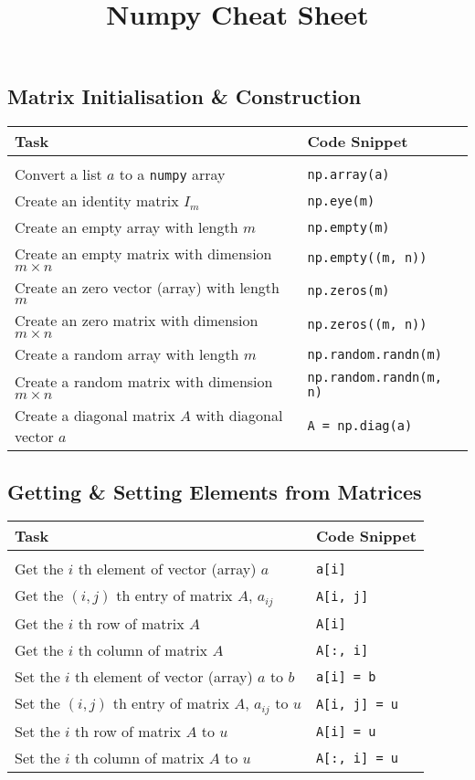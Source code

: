 \documentclass[a4paper,11pt]{article}
\begin{document}
\title{Numpy Cheat Sheet}
\author{}
\date{}
\maketitle
\subsection*{Matrix Initialisation \& Construction}
\begin{tabular}{p{9cm} |p{5cm}}
Task & Code Snippet \\
\hline \\
Convert a list $a$ to a \texttt{numpy} array & \texttt{np.array(a)} \\
Create an identity matrix \(I_m\) & \texttt{np.eye(m)}  \\
Create an empty array with length $m$ & \texttt{np.empty(m)}  \\
Create an empty matrix with dimension $m \times  n$ & \texttt{np.empty((m, n))}\\
Create an zero vector (array) with length \(m\) & \texttt{np.zeros(m)} \\
Create an zero matrix with dimension \(m \times n\)& \texttt{np.zeros((m, n))}\\
Create a random array with length $m$ & \texttt{np.random.randn(m)}  \\
Create a random matrix with dimension \(m \times n\)& \texttt{np.random.randn(m, n)}\\
Create a diagonal matrix $A$ with diagonal vector $a$ &  \texttt{A = np.diag(a)} \\
\end{tabular}
\subsection*{Getting \& Setting Elements from Matrices}
\begin{tabular}{p{9cm} |p{5cm}}
  Task & Code Snippet \\
  \hline \\
Get the $i$ th element of vector (array) $a$ & \texttt{a[i]} \\
Get the $(i, j)$ th entry of matrix $A$,  $a_{ij}$ &  \texttt{A[i, j]}\\
Get the $i$ th row of matrix $A$ & \texttt{A[i]} \\
Get the $i$ th column of matrix $A$ &  \texttt{A[:, i]}\\
Set the $i$ th element of vector (array) $a$ to $b$ & \texttt{a[i] = b} \\
Set the $(i, j)$ th entry of matrix $A$,  $a_{ij}$ to $u$&  \texttt{A[i, j] = u}\\
Set the $i$ th row of matrix $A$ to $u$ & \texttt{A[i] = u}\\
Set the $i$ th column of matrix $A$ to $u$ & \texttt{A[:, i] = u} \\
\end{tabular}
\newpage
\end{document}
